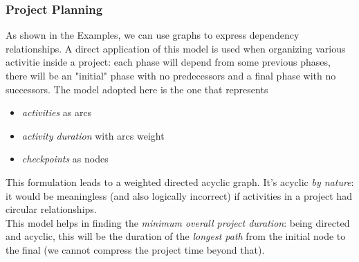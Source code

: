         \subsubsection{Project Planning}
            As shown in the Examples, we can use graphs to express dependency relationships. A direct application of this model is used when organizing various activitie inside a project: each phase will depend from some previous phases, there will be an "initial" phase with no predecessors and a final phase with no successors. The model adopted here is the one that represents
            \begin{itemize}
                \item \textit{activities} as arcs
                \item \textit{activity duration} with arcs weight
                \item \textit{checkpoints} as nodes
            \end{itemize}
            This formulation leads to a weighted directed acyclic graph. It's acyclic \textit{by nature}: it would be meaningless (and also logically incorrect) if activities in a project had circular relationships.\\
            This model helps in finding the \textit{minimum overall project duration}: being directed and acyclic, this will be the duration of the \textit{longest path} from the initial node to the final (we cannot compress the project time beyond that).

